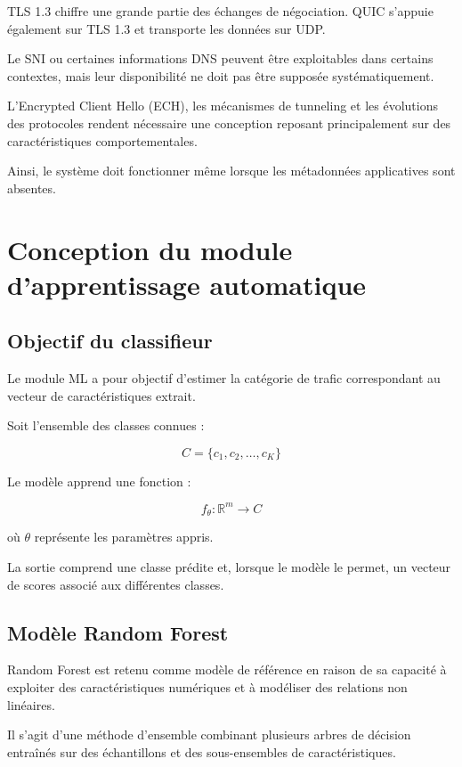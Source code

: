 TLS 1.3 chiffre une grande partie des échanges de négociation.
QUIC s'appuie également sur TLS 1.3 et transporte
les données sur UDP.

Le SNI ou certaines informations DNS peuvent être
exploitables dans certains contextes, mais leur disponibilité
ne doit pas être supposée systématiquement.

L'Encrypted Client Hello (ECH), les mécanismes de
tunneling et les évolutions des protocoles rendent
nécessaire une conception reposant principalement
sur des caractéristiques comportementales.

Ainsi, le système doit fonctionner même lorsque
les métadonnées applicatives sont absentes.

\section{Conception du module d'apprentissage automatique}

\subsection{Objectif du classifieur}

Le module ML a pour objectif d'estimer la catégorie
de trafic correspondant au vecteur de caractéristiques
extrait.

Soit l'ensemble des classes connues :

\[
C=\{c_1,c_2,\ldots,c_K\}
\]

Le modèle apprend une fonction :

\[
f_\theta : \mathbb{R}^{m}\rightarrow C
\]

où $\theta$ représente les paramètres appris.

La sortie comprend une classe prédite et, lorsque
le modèle le permet, un vecteur de scores associé
aux différentes classes.

\subsection{Modèle Random Forest}

Random Forest est retenu comme modèle de référence
en raison de sa capacité à exploiter des caractéristiques
numériques et à modéliser des relations non linéaires.

Il s'agit d'une méthode d'ensemble combinant plusieurs
arbres de décision entraînés sur des échantillons
et des sous-ensembles de caractéristiques.

